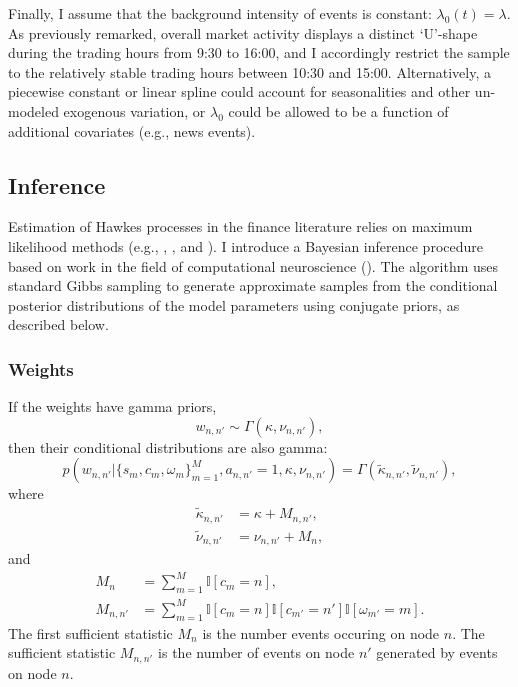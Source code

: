 		Finally, I assume that the background intensity of events is constant: $\lambda_0(t) = \lambda$. As previously remarked, overall market activity displays a distinct `U'-shape during the trading hours from 9:30 to 16:00, and I accordingly restrict the sample to the relatively stable trading hours between 10:30 and 15:00. Alternatively, a piecewise constant or linear spline could account for seasonalities and other un-modeled exogenous variation, or $\lambda_0$ could be allowed to be a function of additional covariates (e.g., news events).

	\subsection{Inference}
		Estimation of Hawkes processes in the finance literature relies on maximum likelihood methods (e.g., \cite{Bowsher2007}, \cite{Large2007}, and \cite{Bacry2013}). I introduce a Bayesian inference procedure based on work in the field of computational neuroscience (\cite{Linderman2015}). The algorithm uses standard Gibbs sampling to generate approximate samples from the conditional posterior distributions of the model parameters using conjugate priors, as described below.

		\subsubsection*{Weights}
			If the weights have gamma priors,
			\begin{equation}
				w_{n,n'} \sim \Gamma(\kappa, \nu_{n,n'}),
			\end{equation}
			then their conditional distributions are also gamma:
			\begin{equation}
				p(w_{n,n'} | \{s_m, c_m, \omega_m\}_{m=1}^M, a_{n,n'} = 1, \kappa, \nu_{n,n'}) = \Gamma(\tilde{\kappa}_{n,n'}, \tilde{\nu}_{n,n'}),
			\end{equation}
			where
			\begin{align}
				\tilde{\kappa}_{n,n'} &= \kappa + M_{n,n'}, \\
				\tilde{\nu}_{n,n'} &= \nu_{n,n'} + M_n,
			\end{align}
			and
			\begin{align}
				M_n &= \sum_{m=1}^{M} \mathbb{I}\left[ c_m = n \right], \\
				M_{n,n'} &= \sum_{m=1}^M \mathbb{I}\left[ c_m = n \right] \mathbb{I}\left[ c_{m'} = n' \right] \mathbb{I}\left[ \omega_{m'} = m \right].
			\end{align}
			The first sufficient statistic $M_n$ is the number events occuring on node $n$. The sufficient statistic $M_{n,n'}$ is the number of events on node $n'$ generated by events on node $n$.

